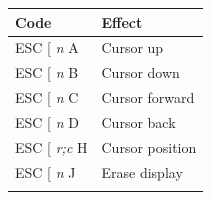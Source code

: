 \documentclass{article}
\begin{document}
\begin{longtable}[]{@{}ll@{}}
\toprule
\begin{minipage}[b]{0.34\columnwidth}\raggedright
Code\strut
\end{minipage} & \begin{minipage}[b]{0.60\columnwidth}\raggedright
Effect\strut
\end{minipage}\tabularnewline
\midrule
\endhead
\begin{minipage}[t]{0.34\columnwidth}\raggedright
ESC {[} \emph{n} A\strut
\end{minipage} & \begin{minipage}[t]{0.60\columnwidth}\raggedright
Cursor up\strut
\end{minipage}\tabularnewline
\begin{minipage}[t]{0.34\columnwidth}\raggedright
ESC {[} \emph{n} B\strut
\end{minipage} & \begin{minipage}[t]{0.60\columnwidth}\raggedright
Cursor down\strut
\end{minipage}\tabularnewline
\begin{minipage}[t]{0.34\columnwidth}\raggedright
ESC {[} \emph{n} C\strut
\end{minipage} & \begin{minipage}[t]{0.60\columnwidth}\raggedright
Cursor forward\strut
\end{minipage}\tabularnewline
\begin{minipage}[t]{0.34\columnwidth}\raggedright
ESC {[} \emph{n} D\strut
\end{minipage} & \begin{minipage}[t]{0.60\columnwidth}\raggedright
Cursor back\strut
\end{minipage}\tabularnewline
\begin{minipage}[t]{0.34\columnwidth}\raggedright
ESC {[} \emph{r;c} H\strut
\end{minipage} & \begin{minipage}[t]{0.60\columnwidth}\raggedright
Cursor position\strut
\end{minipage}\tabularnewline
\begin{minipage}[t]{0.34\columnwidth}\raggedright
ESC {[} \emph{n} J\strut
\end{minipage} & \begin{minipage}[t]{0.60\columnwidth}\raggedright
Erase display\strut
\end{minipage}\tabularnewline
\begin{minipage}[t]{0.34\columnwidth}\raggedright

\end{minipage}
\end{longtable}
\end{document}
